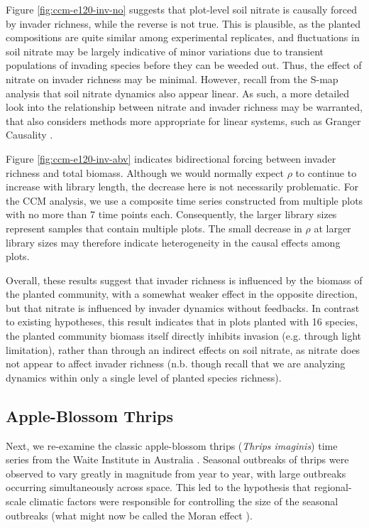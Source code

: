 \documentclass[article]{jss}
\begin{document}
Figure \ref{fig:ccm-e120-inv-no} suggests that plot-level soil nitrate is causally forced by invader richness, while the reverse is not true. This is plausible, as the planted compositions are quite similar among experimental replicates, and fluctuations in soil nitrate may be largely indicative of minor variations due to transient populations of invading species before they can be weeded out. Thus, the effect of nitrate on invader richness may be minimal. However, recall from the S-map analysis that soil nitrate dynamics also appear linear. As such, a more detailed look into the relationship between nitrate and invader richness may be warranted, that also considers methods more appropriate for linear systems, such as Granger Causality \cite{Granger_1969}.

Figure \ref{fig:ccm-e120-inv-abv} indicates bidirectional forcing between invader richness and total biomass. Although we would normally expect $\rho$ to continue to increase with library length, the decrease here is not necessarily problematic. For the CCM analysis, we use a composite time series constructed from multiple plots with no more than 7 time points each. Consequently, the larger library sizes represent samples that contain multiple plots. The small decrease in $\rho$ at larger library sizes may therefore indicate heterogeneity in the causal effects among plots.

Overall, these results suggest that invader richness is influenced by the biomass of the planted community, with a somewhat weaker effect in the opposite direction, but that nitrate is influenced by invader dynamics without feedbacks. In contrast to existing hypotheses, this result indicates that in plots planted with 16 species, the planted community biomass itself directly inhibits invasion (e.g. through light limitation), rather than through an indirect effects on soil nitrate, as nitrate does not appear to affect invader richness (n.b. though recall that we are analyzing dynamics within only a single level of planted species richness).

\subsection{Apple-Blossom Thrips}\label{sec:thrips}

Next, we re-examine the classic apple-blossom thrips (\emph{Thrips imaginis}) time series from the Waite Institute in Australia \citep{Davidson_1948, Davidson_1948a}. Seasonal outbreaks of thrips were observed to vary greatly in magnitude from year to year, with large outbreaks occurring simultaneously across space. This led to the hypothesis that regional-scale climatic factors were responsible for controlling the size of the seasonal outbreaks (what might now be called the Moran effect \cite{Moran_1953}).
\end{document}
